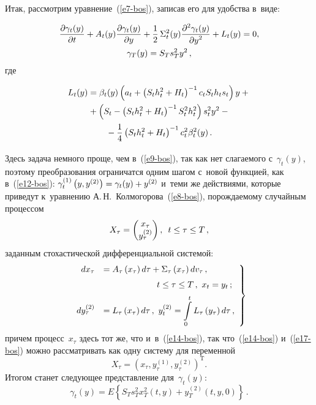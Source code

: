 \begin{multicols}{2}
     Итак, рассмотрим уравнение~(\ref{e7-bos}), записав его для удобства 
в~виде:

\noindent
     \begin{multline}
     \displaystyle\frac{\displaystyle \partial \gamma_t(y)\mathstrut}{\displaystyle \partial t\mathstrut}+A_t(y) \displaystyle\frac{\displaystyle \partial \gamma_t(y)\mathstrut}{\displaystyle \partial y\mathstrut}+\displaystyle\frac{\displaystyle 1\mathstrut}{\displaystyle 2\mathstrut}\,\Sigma_t^2(y)\displaystyle\frac{\displaystyle \partial^2 \gamma_t(y)\mathstrut}{\displaystyle \partial y^2\mathstrut} 
+L_t(y) =0,\\
     \gamma_T(y)=S_T s_T^2 y^2\,,
     \label{e16-bos}
     \end{multline}
где 

\noindent
\begin{multline*}
L_t(y)=\beta_t(y)\left(a_t+ \left(S_t h_t^2+H_t\right)^{-1} c_t S_t h_t s_t\right)y+{}\\
{}+ 
\left(S_t-\left( S_th_t^2 +H_t\right)^{-1} S_t^2 h_t^2\right)s_t^2 y^2-{}\\
{}-\displaystyle\frac{\displaystyle 1\mathstrut}{\displaystyle 4\mathstrut}
\left( S_t h_t^2+H_t\right)^{-1}c_t^2 \beta_t^2(y)\,.
\end{multline*}

\noindent
     Здесь задача немного проще, чем в~(\ref{e9-bos}), так как нет 
слагаемого с~$\gamma_t(y)$, поэтому преобразования ограничатся одним 
шагом с~новой функцией, как в~(\ref{e12-bos}): 
     $\gamma_t^{(1)}\left( y,y^{(2)}\right)\hm= \gamma_t(y)\hm+ y^{(2)}$ 
и~теми же действиями, которые приведут к~уравнению 
А.\,Н.~Колмогорова~(\ref{e8-bos}), порождаемому случайным процессом
     $$
     X_\tau= \begin{pmatrix} x_\tau\\ y_{\tau}^{(2)}\end{pmatrix},\enskip
t\leq \tau\leq T\,,
$$
 заданным стохастической дифференциальной 
сис\-те\-мой:
     \begin{equation}
     \left.
     \begin{array}{rl}
     dx_\tau &= A_\tau\left( x_\tau\right)d\tau +\Sigma_{\tau}\left( 
x_\tau\right)dv_{\tau}\,,\\[6pt]
&\hspace*{22mm}t\leq \tau\leq T\,,\ x_t=y_t\,;\\[6pt]
     dy_\tau^{(2)}&=L_{\tau}\left( x_\tau\right)d\tau\,,\ \displaystyle 
     y_t^{(2)}=\int\limits_0^t L_\tau\left( y_{\tau}\right)d\tau\,,
     \end{array}
     \right\}
     \label{e17-bos}
     \end{equation}
причем процесс~$x_{\tau}$ здесь тот же, что и~в~(\ref{e14-bos}), так 
что~(\ref{e14-bos}) и~(\ref{e17-bos}) можно рассматривать как одну сис\-те\-му 
для переменной 
$$
X_\tau= \left( x_\tau, y_\tau^{(1)}, y_\tau^{(2)}\right)^{\mathrm{T}}.
$$ 
Итогом станет следующее представление для~$\gamma_t(y)$: 
\begin{equation}
\gamma_t(y)=E\left\{ S_T s_T^2 x_T^2(t,y)+y_T^{(2)}(t,y,0)\right\}\,.
\label{e18-bos}
\end{equation}


\end{multicols}
